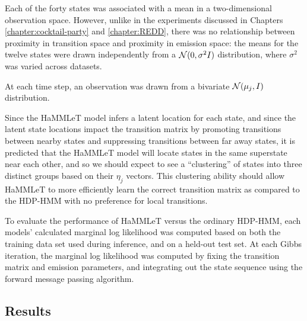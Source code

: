 Each of the forty states was associated with a mean in a two-dimensional observation space.  However, unlike in the experiments discussed in Chapters \ref{chapter:cocktail-party} and \ref{chapter:REDD}, there was no relationship between proximity in transition space and proximity in emission space: the means for the twelve states were drawn independently from a $\mathcal{N}(0,\sigma^2 I)$ distribution, where $\sigma^2$ was varied across datasets.

At each time step, an observation was drawn from a bivariate $\mathcal{N}(\mu_j,I)$ distribution.

Since the HaMMLeT model infers a latent location for each state, and since the latent state locations impact the transition matrix by promoting transitions between nearby states and suppressing transitions between far away states, it is predicted that the HaMMLeT model will locate states in the same superstate near each other, and so we should expect to see a ``clustering'' of states into three distinct groups based on their $\eta_j$ vectors.  This clustering ability should allow HaMMLeT to more efficiently learn the correct transition matrix as compared to the HDP-HMM with no preference for local transitions.

To evaluate the performance of HaMMLeT versus the ordinary HDP-HMM, each models' calculated marginal log likelihood was computed based on both the training data set used during inference, and on a held-out test set.  At each Gibbs iteration, the marginal log likelihood was computed by fixing the transition matrix and emission parameters, and integrating out the state sequence using the forward message passing algorithm.

\subsection{Results}

